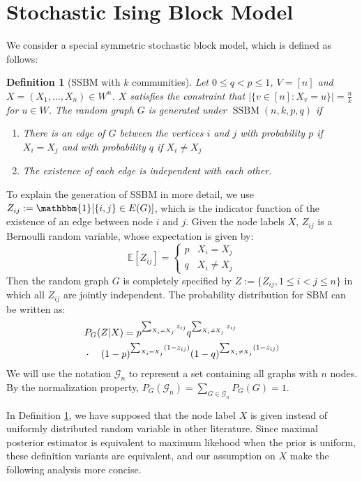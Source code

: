\documentclass[journal]{IEEEtran}
\newtheorem{definition}{Definition}
\newcommand{\cG}{\mathcal{G}}
\newcommand{\1}{\mathbbm{1}}
\DeclareMathOperator{\SSBM}{SSBM}
\begin{document}
\section{Stochastic Ising Block Model}\label{sec:sibm}
We consider a special symmetric stochastic block model, which is defined as follows:
	\begin{definition}[SSBM with $k$ communities] \label{def:SSBM}
	Let $0\leq q<p\leq 1$, $V=[n]$ and $X=(X_1,\dots,X_n)\in W^n$. $X$ satisfies the constraint that $|\{v \in [n] : X_v = u\}| = \frac{n}{k}$ for $u\in W$.
	The random graph $G$ is generated under $\SSBM(n,k,p,q)$ if
	\begin{enumerate}
	\item There is an edge of $G$ between the vertices $i$ and $j$ with probability $p$ if $X_i=X_j$ and with probability $q$ if $X_i \neq X_j$
	\item The existence of each edge is independent with each other.
	\end{enumerate}
\end{definition}
To explain the generation of SSBM in more detail,
we use $Z_{ij}:=\mathbbm{1}[\{i,j\} \in E(G)]$, which is the indicator function of the existence of an edge between node $i$ and $j$.
Given the node labels $X$, $Z_{ij}$ is a Bernoulli random variable, whose expectation is given by:
\begin{equation}
\mathbb{E}[Z_{ij}] =
\begin{cases}
p & X_i = X_j \\ 
q & X_i \neq X_j
\end{cases}
\end{equation}
Then the random graph $G$ is completely specified by $Z:=\{Z_{ij}, 1\leq i<j\leq n\}$ in which all $Z_{ij}$ are jointly independent.
The probability distribution for SBM can be written as:
\begin{align}
&P_G(Z | X) = p^{\sum_{X_i = X_j} z_{ij}}q^{\sum_{X_i \neq X_j} z_{ij}} \notag \\
&\cdot \quad (1-p)^{\sum_{X_i = X_j} (1-z_{ij})}(1-q)^{\sum_{X_i \neq X_j} (1-z_{ij})} \label{eq:GmL}
\end{align}
We will use the notation $\cG_n$ to represent a set containing all graphs with $n$ nodes. By the normalization property,
$P_G(\cG_n) = \sum_{G\in \cG_n}P_G(G)=1$.

In Definition \ref{def:SSBM}, we have supposed that the node label $X$ is given instead of uniformly distributed random variable
in other literature. Since maximal posterior estimator is equivalent to maximum likehood when the prior is uniform,
these definition variants are equivalent, and our assumption on $X$ make the following analysis more concise.
\end{document}
